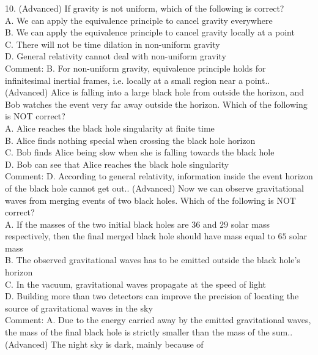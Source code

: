 \documentclass[12pt]{book} %
\numberwithin{equation}{chapter}
\begin{document}
10. (Advanced) If gravity is not uniform, which of the following is correct?\\
A. We can apply the equivalence principle to cancel gravity everywhere\\
B. We can apply the equivalence principle to cancel gravity locally at a point\\
C. There will not be time dilation in non-uniform gravity\\
D. General relativity cannot deal with non-uniform gravity\\
Comment: B. For non-uniform gravity, equivalence principle holds for infinitesimal inertial frames, i.e. locally at a small region near a point.\bigskip{}. (Advanced) Alice is falling into a large black hole from outside the horizon, and Bob watches the event very far away outside the horizon. Which of the following is NOT correct?\\
A. Alice reaches the black hole singularity at finite time\\
B. Alice finds nothing special when crossing the black hole horizon\\
C. Bob finds Alice being slow when she is falling towards the black hole\\
D. Bob can see that Alice reaches the black hole singularity\\
Comment: D. According to general relativity, information inside the event horizon of the black hole cannot get out.\bigskip{}. (Advanced) Now we can observe gravitational waves from merging events of two black holes. Which of the following is NOT correct?\\
A. If the masses of the two initial black holes are $36$ and $29$ solar mass respectively, then the final merged black hole should have mass equal to $65$ solar mass\\
B. The observed gravitational waves has to be emitted outside the black hole's horizon\\
C. In the vacuum, gravitational waves propagate at the speed of light\\
D. Building more than two detectors can improve the precision of locating the source of gravitational
waves in the sky\\
Comment: A. Due to the energy carried away by the emitted gravitational waves, the mass of the final black hole is strictly smaller than the mass of the sum.\bigskip{}. (Advanced) The night sky is dark, mainly because of\\
\end{document}
